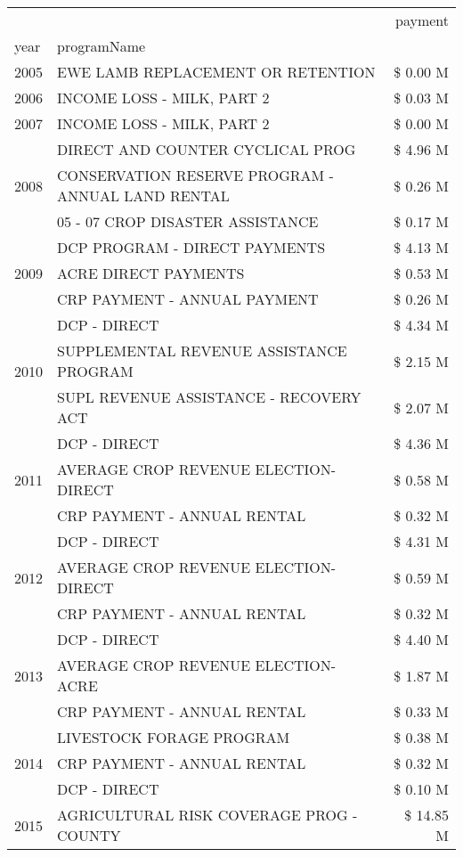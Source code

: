 \begin{tabular}{llr}
\toprule
 &  & payment \\
year & programName &  \\
\midrule
2005 & EWE LAMB REPLACEMENT OR RETENTION & \$ 0.00 M \\
\cline{1-3}
2006 & INCOME LOSS - MILK, PART 2 & \$ 0.03 M \\
\cline{1-3}
2007 & INCOME LOSS - MILK, PART 2 & \$ 0.00 M \\
\cline{1-3}
\multirow[t]{3}{*}{2008} & DIRECT AND COUNTER CYCLICAL PROG & \$ 4.96 M \\
 & CONSERVATION RESERVE PROGRAM - ANNUAL LAND RENTAL & \$ 0.26 M \\
 & 05 - 07 CROP DISASTER ASSISTANCE & \$ 0.17 M \\
\cline{1-3}
\multirow[t]{3}{*}{2009} & DCP PROGRAM - DIRECT PAYMENTS & \$ 4.13 M \\
 & ACRE DIRECT PAYMENTS & \$ 0.53 M \\
 & CRP PAYMENT - ANNUAL PAYMENT & \$ 0.26 M \\
\cline{1-3}
\multirow[t]{3}{*}{2010} & DCP - DIRECT & \$ 4.34 M \\
 & SUPPLEMENTAL REVENUE ASSISTANCE PROGRAM & \$ 2.15 M \\
 & SUPL REVENUE ASSISTANCE - RECOVERY ACT & \$ 2.07 M \\
\cline{1-3}
\multirow[t]{3}{*}{2011} & DCP - DIRECT & \$ 4.36 M \\
 & AVERAGE CROP REVENUE ELECTION-DIRECT & \$ 0.58 M \\
 & CRP PAYMENT - ANNUAL RENTAL & \$ 0.32 M \\
\cline{1-3}
\multirow[t]{3}{*}{2012} & DCP - DIRECT & \$ 4.31 M \\
 & AVERAGE CROP REVENUE ELECTION-DIRECT & \$ 0.59 M \\
 & CRP PAYMENT - ANNUAL RENTAL & \$ 0.32 M \\
\cline{1-3}
\multirow[t]{3}{*}{2013} & DCP - DIRECT & \$ 4.40 M \\
 & AVERAGE CROP REVENUE ELECTION-ACRE & \$ 1.87 M \\
 & CRP PAYMENT - ANNUAL RENTAL & \$ 0.33 M \\
\cline{1-3}
\multirow[t]{3}{*}{2014} & LIVESTOCK FORAGE PROGRAM & \$ 0.38 M \\
 & CRP PAYMENT - ANNUAL RENTAL & \$ 0.32 M \\
 & DCP - DIRECT & \$ 0.10 M \\
\cline{1-3}
\multirow[t]{3}{*}{2015} & AGRICULTURAL RISK COVERAGE PROG - COUNTY & \$ 14.85 M \\

\end{tabular}

